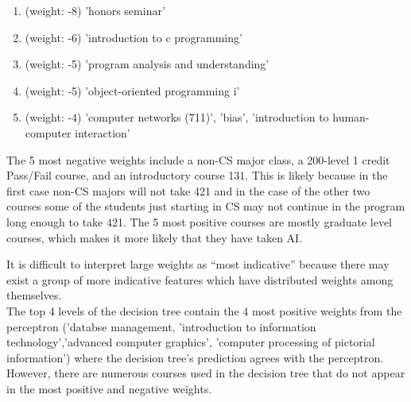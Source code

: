 \documentclass[a4paper,11pt]{article}
\begin{document}
\begin{enumerate}
\item (weight: -8) 'honors seminar'
\item (weight: -6) 'introduction to c programming'
\item  (weight: -5) 'program analysis and understanding'
\item (weight: -5) 'object-oriented programming i'
\item (weight: -4) 'computer networks (711)', 'bias',   'introduction to human-computer interaction' 
\end{enumerate}

The 5 most negative weights include a non-CS
major class, a 200-level 1 credit Pass/Fail course, and an
introductory course 131. This is likely
because in the first case non-CS majors will not take 421 and in the
case of the other two courses some of the students just starting in CS
may not continue in the program long enough to take 421. The 5 most positive
courses are mostly graduate level courses, which makes it more likely
that they have taken AI.

It is difficult to interpret large weights as ``most indicative'' because there may exist a group of more indicative
features which have distributed weights among themselves.\\

The top 4 levels of the decision tree contain the 4 most positive weights
from the perceptron ('databse management, 'introduction to information
technology','advanced computer graphics', 'computer processing of
pictorial information') where the decision tree's prediction agrees 
with the perceptron. However, there are numerous courses used in the 
decision tree that do not appear in the most positive and negative weights. 
      
\end{document}

